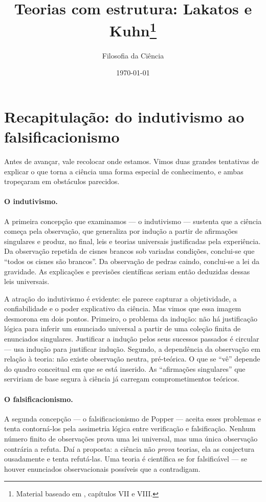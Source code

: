 \documentclass[9pt,a4paper]{extarticle}
\title{Teorias com estrutura: Lakatos e Kuhn\footnote{Material baseado em \citet{chalmers1993}, capítulos VII e VIII.}}
\author{Filosofia da Ciência}
\date{\today}
\newcommand{\impt}[1]{\textcolor{important}{#1}}
\theoremstyle{definition}
\begin{document}
\maketitle
\tableofcontents

\bigskip

\section{Recapitulação: do indutivismo ao falsificacionismo}

Antes de avançar, vale recolocar onde estamos. Vimos duas grandes tentativas de explicar o que torna a ciência uma forma especial de conhecimento, e ambas tropeçaram em obstáculos parecidos.

\paragraph{O indutivismo.}
A primeira concepção que examinamos --- o indutivismo --- sustenta que a ciência \impt{começa pela observação}, que generaliza por \impt{indução} a partir de afirmações singulares e produz, no final, leis e teorias universais justificadas pela experiência. Da observação repetida de cisnes brancos sob variadas condições, conclui-se que ``todos os cisnes são brancos''. Da observação de pedras caindo, conclui-se a lei da gravidade. As explicações e previsões científicas seriam então deduzidas dessas leis universais.

A atração do indutivismo é evidente: ele parece capturar a objetividade, a confiabilidade e o poder explicativo da ciência. Mas vimos que essa imagem desmorona em dois pontos. Primeiro, o \impt{problema da indução}: não há justificação lógica para inferir um enunciado universal a partir de uma coleção finita de enunciados singulares. Justificar a indução pelos seus sucessos passados é circular --- usa indução para justificar indução. Segundo, a \impt{dependência da observação em relação à teoria}: não existe observação neutra, pré-teórica. O que se ``vê'' depende do quadro conceitual em que se está inserido. As ``afirmações singulares'' que serviriam de base segura à ciência já carregam comprometimentos teóricos.

\paragraph{O falsificacionismo.}
A segunda concepção --- o falsificacionismo de Popper --- aceita esses problemas e tenta contorná-los pela \impt{assimetria lógica} entre verificação e falsificação. Nenhum número finito de observações prova uma lei universal, mas uma única observação contrária a refuta. Daí a proposta: a ciência não \emph{prova} teorias, ela as \impt{conjectura ousadamente} e tenta refutá-las. Uma teoria é científica se for \impt{falsificável} --- se houver enunciados observacionais possíveis que a contradigam.
\end{document}
